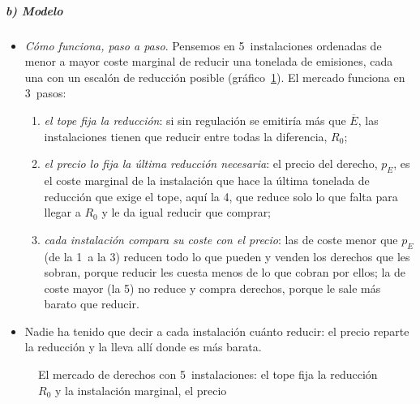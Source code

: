\documentclass[11pt]{article}
\begin{document}
\begin{infografia}[H]
\centering
\caption{Cómo funciona un mercado de derechos de emisión: del tope a la reducción al mínimo coste}\label{figu:cap-and-trade-esquema}
\end{infografia}

\subparagraph{b) Modelo}
\begin{itemize}
\item \emph{Cómo funciona, paso a paso}. Pensemos en 5~instalaciones ordenadas de menor a mayor coste marginal de reducir una tonelada de emisiones, cada una con un escalón de reducción posible (gráfico~\ref{fig:cap-and-trade-instalaciones}). El mercado funciona en 3~pasos:
  \begin{enumerate}
  \item \emph{el tope fija la reducción}: si sin regulación se emitiría más que $\overline{E}$, las instalaciones tienen que reducir entre todas la diferencia, $R_0$;
  \item \emph{el precio lo fija la última reducción necesaria}: el precio del derecho, $p_E$, es el coste marginal de la instalación que hace la última tonelada de reducción que exige el tope, aquí la 4, que reduce solo lo que falta para llegar a $R_0$ y le da igual reducir que comprar;
  \item \emph{cada instalación compara su coste con el precio}: las de coste menor que $p_E$ (de la 1~a la 3) reducen todo lo que pueden y venden los derechos que les sobran, porque reducir les cuesta menos de lo que cobran por ellos; la de coste mayor (la 5) no reduce y compra derechos, porque le sale más barato que reducir.
  \end{enumerate}
\item Nadie ha tenido que decir a cada instalación cuánto reducir: el precio reparte la reducción y la lleva allí donde es más barata.
\end{itemize}

\begin{figure}[H]
\centering
\caption{El mercado de derechos con 5~instalaciones: el tope fija la reducción $R_0$ y la instalación marginal, el precio}\label{fig:cap-and-trade-instalaciones}
\end{figure}
\end{document}
